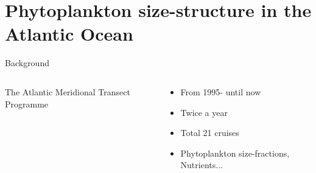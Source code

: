 \documentclass{beamer}
\begin{document}
\section{Phytoplankton size-structure in the Atlantic Ocean}
\begin{frame}{Background}

\begin{columns}[t]

\begin{column}{0.7\linewidth}

The Atlantic Meridional Transect Programme



\end{column}

\begin{column}{0.3\linewidth}

\vspace{1cm}

\begin{itemize}

\item From 1995- until now

\item Twice a year

\item Total 21 cruises

\item Phytoplankton size-fractions, Nutrients... 

\end{itemize}

\end{column}

\end{columns}

\end{frame}
\end{document}
